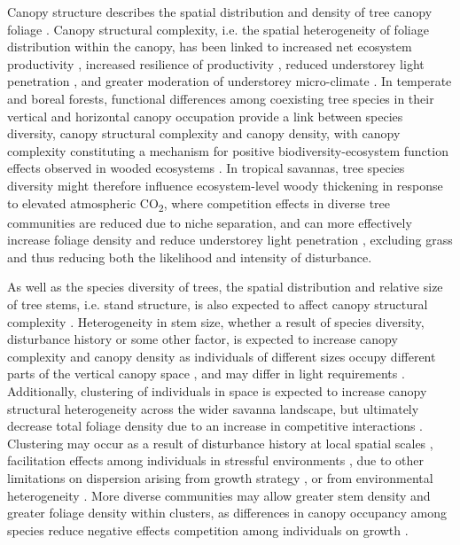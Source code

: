 \documentclass[11pt,a4paper]{article}
\begin{document}
Canopy structure describes the spatial distribution and density of tree canopy foliage \citep{Lowman2004}. Canopy structural complexity, i.e. the spatial heterogeneity of foliage distribution within the canopy, has been linked to increased net ecosystem productivity \citep{Gough2019, Hardiman2011, Chen2012, Law2001, Baldocchi2001, Morin2015}, increased resilience of productivity \citep{Pretzsch2014}, reduced understorey light penetration \citep{Scheuermann2018, Sercu2017, Fotis2018}, and greater moderation of understorey micro-climate \citep{Wright2017}. In temperate and boreal forests, functional differences among coexisting tree species in their vertical and horizontal canopy occupation provide a link between species diversity, canopy structural complexity and canopy density, with canopy complexity constituting a mechanism for positive biodiversity-ecosystem function effects observed in wooded ecosystems \citep{Pretzsch2014, Barry2019}. In tropical savannas, tree species diversity might therefore influence ecosystem-level woody thickening in response to elevated atmospheric CO\textsubscript{2}, where competition effects in diverse tree communities are reduced due to niche separation, and can more effectively increase foliage density and reduce understorey light penetration \citep{Sercu2017}, excluding grass and thus reducing both the likelihood and intensity of disturbance. 

As well as the species diversity of trees, the spatial distribution and relative size of tree stems, i.e. stand structure, is also expected to affect canopy structural complexity \citep{Stark2015}. Heterogeneity in stem size, whether a result of species diversity, disturbance history or some other factor, is expected to increase canopy complexity and canopy density as individuals of different sizes occupy different parts of the vertical canopy space \citep{Panzou2020}, and may differ in light requirements \citep{CharlesDominique2018}. Additionally, clustering of individuals in space is expected to increase canopy structural heterogeneity across the wider savanna landscape, but ultimately decrease total foliage density due to an increase in competitive interactions \citep{Dohn2017}. Clustering may occur as a result of disturbance history at local spatial scales \citep{Schertzer2015, Groen2007}, facilitation effects among individuals in stressful environments \citep{Ratcliffe2017}, due to other limitations on dispersion arising from growth strategy \citep{Silva2011}, or from environmental heterogeneity \citep{Getzin2008}. More diverse communities may allow greater stem density and greater foliage density within clusters, as differences in canopy occupancy among species reduce negative effects competition among individuals on growth \citep{Gough2019}.
\end{document}
